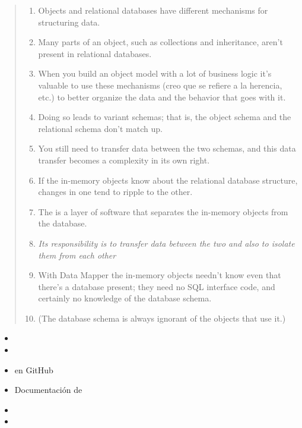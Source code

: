 \begin{quote}
\begin{enumerate}
\item 
Objects and relational databases have different mechanisms for structuring
data. 
\item 
Many parts of an object, such as collections and inheritance,
aren't present in relational databases. 
\item 
When you build an
object model with a lot of business logic it's valuable to use these
mechanisms (creo que se refiere a la herencia, etc.) 
to better organize the data and the behavior that goes with
it. 
\item 
Doing so leads to variant schemas; that is, the object
schema and the relational schema don't match up.
\item 
You still need to transfer data between the two schemas, and this data
transfer becomes a complexity in its own right. 
\item 
If the in-memory objects
know about the relational database structure, changes in
one tend to ripple to the other.
\item 
The  is a layer of software that separates the in-memory
objects from the database. 
\item 
\emph{Its responsibility is to transfer data between
the two and also to isolate them from each other}
\item 
 With
Data Mapper the in-memory objects needn't know even that there's a
database present; they need no SQL interface code, and certainly no
knowledge of the database schema. 
\item 
(The database schema is always
ignorant of the objects that use it.) 
\end{enumerate}
\end{quote}

\begin{itemize}
\item {}
\item
{}
\item
{} en GitHub
\item
Documentación de 
\item
{}
\item
{}
\end{itemize}

